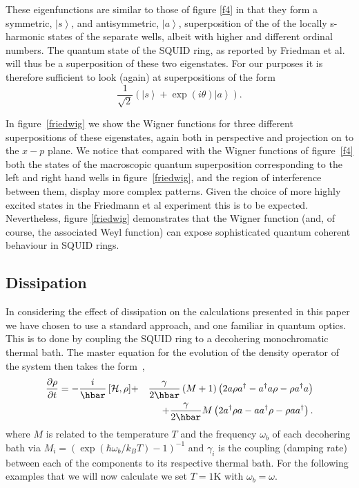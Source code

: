 \documentclass[twocolumn,a4paper,superscriptaddress,showpacs,floatfix,pra]{revtex4}
\begin{document}
These eigenfunctions are  similar to those of figure  \ref{f4} in that
they   form   a   symmetric,   $\left\vert   s\right\rangle   $,   and
antisymmetric, $\left\vert  a\right\rangle $, superposition  of the of
the  locally s-harmonic  states  of the  separate  wells, albeit  with
higher and different  ordinal numbers. The quantum state  of the SQUID
ring, as  reported by Friedman et  al.~\cite{FriedmanPCTL00} will thus
be a superposition  of these two eigenstates.  For  our purposes it is
therefore sufficient to look (again) at superpositions of the form
\begin{equation}
\frac{1}{\sqrt{2}}\left( \left\vert s\right\rangle +\exp (i\theta
)\left\vert a\right\rangle \right) .  \label{phaseequ2}
\end{equation}

In  figure~\ref{friedwig}  we  show  the Wigner  functions  for  three
different   superpositions  of  these   eigenstates,  again   both  in
perspective  and projection  on to  the $x-p$  plane.  We  notice that
compared with the Wigner  functions of figure~\ref{f4} both the states
of the macroscopic quantum superposition corresponding to the left and
right  hand   wells  in  figure~\ref{friedwig},  and   the  region  of
interference between  them, display more complex  patterns.  Given the
choice of more highly excited states in the Friedmann et al experiment
this   is  to  be   expected.   Nevertheless,   figure  \ref{friedwig}
demonstrates that the Wigner  function (and, of course, the associated
Weyl function) can expose  sophisticated quantum coherent behaviour in
SQUID rings.

\subsection*{Dissipation}

In considering the effect of dissipation on the calculations presented
in  this paper  we have  chosen to  use a  standard approach,  and one
familiar {in} quantum optics. This  is to done by coupling the {SQUID}
ring to  a decohering monochromatic thermal bath.  The master equation
for the evolution of the density operator of the system then takes the
form~\cite{weiss1999},
\begin{eqnarray}
\frac{\partial \rho }{\partial t}=-\frac{i}{\hbar }\left[ \mathcal{H},\rho \right] &+&\frac{\gamma }{2\hbar }\left( M+1\right) \left( 2a\rho a^{\dagger
}-a^{\dagger }a\rho -\rho a^{\dagger }a\right)  \notag \\
&&+\frac{\gamma }{2\hbar }M\left( 2a^{\dagger }\rho a-aa^{\dagger }\rho
-\rho aa^{\dagger }\right) .  \label{dis}
\end{eqnarray}
where $M$ is related to  the temperature $T$ and the frequency $\omega
_{b}$  of each  decohering bath  via $M_{i}=\left(  \exp  \left( \hbar
\omega _{b}/k_{B}T\right)  -1\right) ^{-1}$  and $\gamma _{i}$  is the
coupling  (damping  rate)  between  each  of  the  components  to  its
respective thermal bath. For the {following} examples that we will now
calculate we set $T=1\mathrm{K}$ with $\omega_{b}=\omega$.
\end{document}
